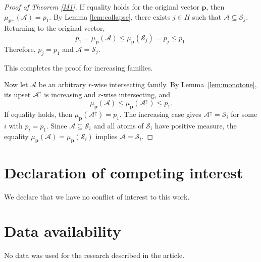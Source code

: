 \documentclass[11pt]{article}
\begin{document}
\begin{proof}[Proof of Theorem \ref{M1}]
If equality holds for the original vector $\mathbf p$, then
$\mu_{\mathbf p^+}(\mathcal A)=p_1$.  By Lemma \ref{lem:collapse}, there exists
$j\in H$ such that $\mathcal A\subseteq\mathcal S_j$.  Returning to the original vector,
\[
 p_1=\mu_{\mathbf p}(\mathcal A)\le\mu_{\mathbf p}(\mathcal S_j)=p_j\le p_1.
\]
Therefore, $p_j=p_1$ and 
$\mathcal A=\mathcal S_j$.

This completes the proof for increasing families.

Now let $\mathcal A$ be an arbitrary $r$-wise intersecting family.  By
Lemma~\ref{lem:monotone}, its upset $\mathcal A^\uparrow$ is increasing and
$r$-wise intersecting, and
$$
 \mu_{\mathbf p}(\mathcal A)\le\mu_{\mathbf p}(\mathcal A^\uparrow)\le p_1.
$$
If equality holds, then $\mu_{\mathbf p}(\mathcal A^\uparrow)=p_1$.  The increasing
case gives $\mathcal A^\uparrow=\mathcal S_i$ for some $i$ with $p_i=p_1$.  Since
$\mathcal A\subseteq\mathcal S_i$ and all atoms of $\mathcal S_i$ have positive measure, the
equality $\mu_{\mathbf p}(\mathcal A)=\mu_{\mathbf p}(\mathcal S_i)$ implies
$\mathcal A=\mathcal S_i$.
\end{proof}












\section*{Declaration of competing interest}
We declare that we have no conflict of interest to this work.

\section*{Data availability}
No data was used for the research described in the article.



\end{document}
